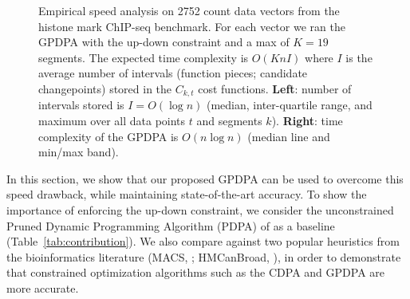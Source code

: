 \documentclass[aoas]{imsart}
\begin{document}
\begin{figure}[t!]
  \centering
  \parbox{0.49\textwidth}{
    
  }
  \parbox{0.49\textwidth}{
    
  }
  \vskip -0.5cm
  \caption{Empirical speed analysis on 2752 count data vectors from
    the histone mark ChIP-seq benchmark. For each vector we ran the
    GPDPA with the up-down constraint and a max of $K=19$
    segments. The expected time complexity is $O(KnI)$ where $I$ is
    the average number of intervals (function pieces; candidate
    changepoints) stored in the $C_{k,t}$ cost
    functions. \textbf{Left}: number of intervals stored is
    $I=O(\log n)$ (median, inter-quartile range, and maximum over all
    data points $t$ and segments $k$).  \textbf{Right}: time
    complexity of the GPDPA is $O(n\log n)$ (median line and min/max
    band).}
  \label{fig:timings}
\end{figure}

In this section, we show that our proposed GPDPA can be used to
overcome this speed drawback, while maintaining state-of-the-art
accuracy. To show the importance of enforcing the up-down constraint,
we consider the unconstrained Pruned Dynamic Programming Algorithm
(PDPA) of \citet{pruned-dp} as a baseline
(Table~\ref{tab:contribution}). We also compare against two popular
heuristics from the bioinformatics literature (MACS, \citet{MACS};
HMCanBroad, \citet{HMCan}), in order to demonstrate that constrained
optimization algorithms such as the CDPA and GPDPA are more accurate.
\end{document}
